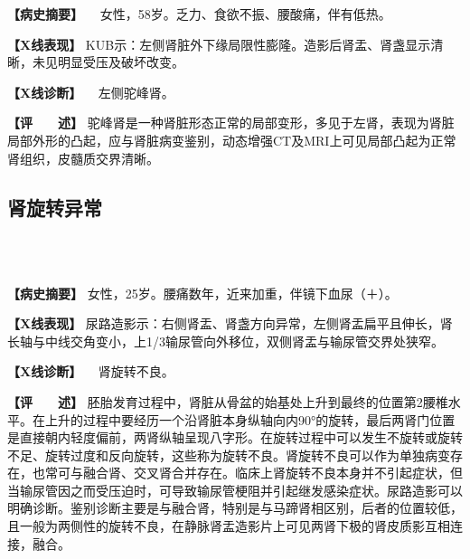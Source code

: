 \textbf{【病史摘要】} 　女性，58岁。乏力、食欲不振、腰酸痛，伴有低热。

\textbf{【X线表现】}
KUB示：左侧肾脏外下缘局限性膨隆。造影后肾盂、肾盏显示清晰，未见明显受压及破坏改变。

\textbf{【X线诊断】} 　左侧驼峰肾。

\textbf{【评　　述】}
驼峰肾是一种肾脏形态正常的局部变形，多见于左肾，表现为肾脏局部外形的凸起，应与肾脏病变鉴别，动态增强CT及MRI上可见局部凸起为正常肾组织，皮髓质交界清晰。

\subsection{肾旋转异常}

\begin{figure}
    \centering
    \\
    \\
    \caption{}
    \label{fig6-2-2}
\end{figure}

\textbf{【病史摘要】}
女性，25岁。腰痛数年，近来加重，伴镜下血尿（＋）。

\textbf{【X线表现】}
尿路造影示：右侧肾盂、肾盏方向异常，左侧肾盂扁平且伸长，肾长轴与中线交角变小，上1/3输尿管向外移位，双侧肾盂与输尿管交界处狭窄。

\textbf{【X线诊断】} 　肾旋转不良。

\textbf{【评　　述】}
胚胎发育过程中，肾脏从骨盆的始基处上升到最终的位置第2腰椎水平。在上升的过程中要经历一个沿肾脏本身纵轴向内90°的旋转，最后两肾门位置是直接朝内轻度偏前，两肾纵轴呈现八字形。在旋转过程中可以发生不旋转或旋转不足、旋转过度和反向旋转，这些称为旋转不良。肾旋转不良可以作为单独病变存在，也常可与融合肾、交叉肾合并存在。临床上肾旋转不良本身并不引起症状，但当输尿管因之而受压迫时，可导致输尿管梗阻并引起继发感染症状。尿路造影可以明确诊断。鉴别诊断主要是与融合肾，特别是与马蹄肾相区别，后者的位置较低，且一般为两侧性的旋转不良，在静脉肾盂造影片上可见两肾下极的肾皮质影互相连接，融合。

